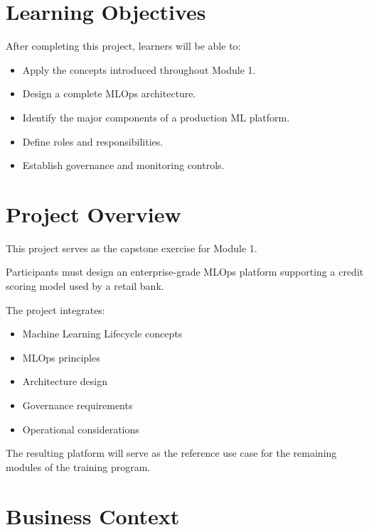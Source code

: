 
\label{chap:mini-project}

\section{Learning Objectives}

After completing this project, learners will be able to:

\begin{itemize}
    \item Apply the concepts introduced throughout Module 1.
    \item Design a complete MLOps architecture.
    \item Identify the major components of a production ML platform.
    \item Define roles and responsibilities.
    \item Establish governance and monitoring controls.
\end{itemize}

\section{Project Overview}

This project serves as the capstone exercise for Module 1.

Participants must design an enterprise-grade MLOps platform supporting a credit scoring model used by a retail bank.

The project integrates:

\begin{itemize}
    \item Machine Learning Lifecycle concepts
    \item MLOps principles
    \item Architecture design
    \item Governance requirements
    \item Operational considerations
\end{itemize}

The resulting platform will serve as the reference use case for the remaining modules of the training program.

\section{Business Context}

